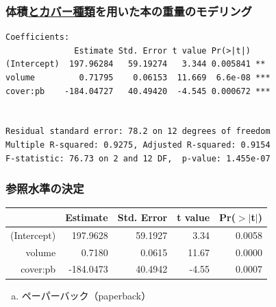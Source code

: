 
\begin{frame}[fragile]
\frametitle{体積\underline{とカバー種類}を用いた本の重量のモデリング}

\begin{verbatim}
Coefficients:
              Estimate Std. Error t value Pr(>|t|)
(Intercept)  197.96284   59.19274   3.344 0.005841 **
volume         0.71795    0.06153  11.669  6.6e-08 ***
cover:pb    -184.04727   40.49420  -4.545 0.000672 ***


Residual standard error: 78.2 on 12 degrees of freedom
Multiple R-squared: 0.9275,	Adjusted R-squared: 0.9154
F-statistic: 76.73 on 2 and 12 DF,  p-value: 1.455e-07
\end{verbatim}

\end{frame}


\begin{frame}
\frametitle{参照水準の決定}


{\small
\begin{center}
\begin{tabular}{rrrrr}
  \hline
 & Estimate & Std. Error & t value & Pr($>$$|$t$|$) \\
  \hline
(Intercept) & 197.9628 & 59.1927 & 3.34 & 0.0058 \\
  volume & 0.7180 & 0.0615 & 11.67 & 0.0000 \\
  cover:pb & -184.0473 & 40.4942 & -4.55 & 0.0007 \\
   \hline
\end{tabular}
\end{center}
}

\begin{enumerate}[(a)]
\item ペーパーバック（paperback）
\end{enumerate}

\end{frame}



